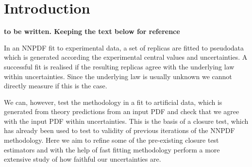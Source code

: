 \section{Introduction}
\label{sec:Intro}

{\bf to be written. Keeping the text below for reference}

In an NNPDF fit to experimental data, a set of replicas are fitted to pseudodata
which is generated according the experimental central values and uncertainties.
A successful fit is realised if the resulting replicas agree with the underlying
law within uncertainties. Since the underlying law is usually unknown we cannot
directly measure if this is the case.

We can, however, test the methodology in a fit to artificial data, which is
generated from theory predictions from an input PDF and check that we agree with
the input PDF within uncertainties. This is the basis of a closure test, which
has already been used to test to validity of previous iterations of the NNPDF
methodology. Here we aim to refine some of the pre-existing closure test
estimators and with the help of fast fitting methodology perform a more
extensive study of how faithful our uncertainties are.

